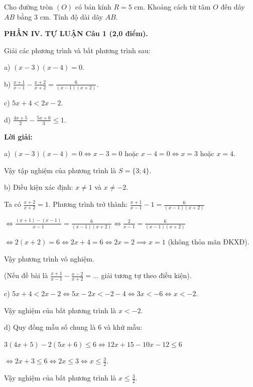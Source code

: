 \documentclass[12pt,a4paper]{article}
\begin{document}
\begin{ex}
Cho đường tròn $(O)$ có bán kính $R = 5\text{ cm}$. Khoảng cách từ tâm $O$ đến dây $AB$ bằng $3\text{ cm}$. Tính độ dài dây $AB$.
\end{ex}


\newpage
\noindent\textbf{\large PHẦN IV. TỰ LUẬN}
\vspace{1mm}
\noindent\textbf{Câu 1 (2,0 điểm).}

Giải các phương trình và bất phương trình sau:\par a) $(x - 3)(x - 4) = 0$.\par b) $\frac{x + 1}{x - 1} - \frac{x + 2}{x + 2} = \frac{6}{(x - 1)(x + 2)}$.\par c) $5x + 4 < 2x - 2$.\par d) $\frac{4x + 5}{2} - \frac{5x + 6}{3} \le 1$.

\noindent\textbf{Lời giải:}

a) $(x - 3)(x - 4) = 0 \iff x - 3 = 0$ hoặc $x - 4 = 0 \iff x = 3$ hoặc $x = 4$.\par Vậy tập nghiệm của phương trình là $S = \{3; 4\}$.\par b) Điều kiện xác định: $x \neq 1$ và $x \neq -2$.\par Ta có $\frac{x + 2}{x + 2} = 1$. Phương trình trở thành: $\frac{x + 1}{x - 1} - 1 = \frac{6}{(x - 1)(x + 2)}$\par $\iff \frac{(x + 1) - (x - 1)}{x - 1} = \frac{6}{(x - 1)(x + 2)} \iff \frac{2}{x - 1} = \frac{6}{(x - 1)(x + 2)}$\par $\iff 2(x + 2) = 6 \iff 2x + 4 = 6 \iff 2x = 2 \implies x = 1$ (không thỏa mãn ĐKXĐ).\par Vậy phương trình vô nghiệm.\par (Nếu đề bài là $\frac{x + 1}{x - 1} - \frac{x - 2}{x + 2} = \dots$ giải tương tự theo điều kiện).\par c) $5x + 4 < 2x - 2 \iff 5x - 2x < -2 - 4 \iff 3x < -6 \iff x < -2$.\par Vậy nghiệm của bất phương trình là $x < -2$.\par d) Quy đồng mẫu số chung là 6 và khử mẫu:\par $3(4x + 5) - 2(5x + 6) \le 6 \iff 12x + 15 - 10x - 12 \le 6$\par $\iff 2x + 3 \le 6 \iff 2x \le 3 \iff x \le \frac{3}{2}$.\par Vậy nghiệm của bất phương trình là $x \le \frac{3}{2}$.
\end{document}
